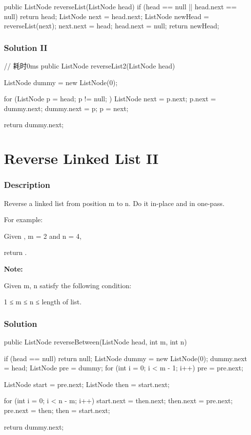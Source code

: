 \begin{Code}
public ListNode reverseList(ListNode head) {
    if (head == null || head.next == null) {
        return head;
    }
    ListNode next = head.next;
    ListNode newHead = reverseList(next);
    next.next = head;
    head.next = null;
    return newHead;
}
\end{Code}

\subsubsection{Solution II}
\begin{Code}
// 耗时0ms
public ListNode reverseList2(ListNode head) {
    ListNode dummy = new ListNode(0);

    for (ListNode p = head; p != null; ) {
        ListNode next = p.next;
        p.next = dummy.next;
        dummy.next = p;
        p = next;
    }

    return dummy.next;
}
\end{Code}

\newpage

\section{Reverse Linked List II} %

\subsubsection{Description}
Reverse a linked list from position m to n. Do it in-place and in one-pass.

For example:

Given , m = 2 and n = 4,

return .

\textbf{Note:}

Given m, n satisfy the following condition:

1 ≤ m ≤ n ≤ length of list.

\subsubsection{Solution}

\begin{Code}
public ListNode reverseBetween(ListNode head, int m, int n) {
    if (head == null) return null;
    ListNode dummy = new ListNode(0);
    dummy.next = head;
    ListNode pre = dummy;
    for (int i = 0; i < m - 1; i++) pre = pre.next;

    ListNode start = pre.next;
    ListNode then = start.next;

    for (int i = 0; i < n - m; i++) {
        start.next = then.next;
        then.next = pre.next;
        pre.next = then;
        then = start.next;
    }

    return dummy.next;
}
\end{Code}

